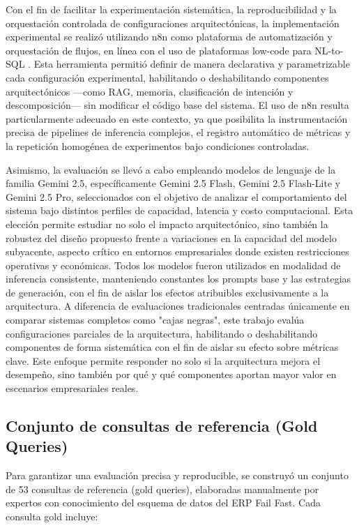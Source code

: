 \documentclass[journal]{IEEEtran}
\begin{document}
Con el fin de facilitar la experimentación sistemática, la reproducibilidad y la orquestación controlada de configuraciones arquitectónicas, la implementación experimental se realizó utilizando n8n como plataforma de automatización y orquestación de flujos, en línea con el uso de plataformas low-code para NL-to-SQL \cite{aparicio2023natural}. Esta herramienta permitió definir de manera declarativa y parametrizable cada configuración experimental, habilitando o deshabilitando componentes arquitectónicos —como RAG, memoria, clasificación de intención y descomposición— sin modificar el código base del sistema. El uso de n8n resulta particularmente adecuado en este contexto, ya que posibilita la instrumentación precisa de pipelines de inferencia complejos, el registro automático de métricas y la repetición homogénea de experimentos bajo condiciones controladas.

Asimismo, la evaluación se llevó a cabo empleando modelos de lenguaje de la familia Gemini 2.5, específicamente Gemini 2.5 Flash, Gemini 2.5 Flash-Lite y Gemini 2.5 Pro, seleccionados con el objetivo de analizar el comportamiento del sistema bajo distintos perfiles de capacidad, latencia y costo computacional. Esta elección permite estudiar no solo el impacto arquitectónico, sino también la robustez del diseño propuesto frente a variaciones en la capacidad del modelo subyacente, aspecto crítico en entornos empresariales donde existen restricciones operativas y económicas. Todos los modelos fueron utilizados en modalidad de inferencia consistente, manteniendo constantes los prompts base y las estrategias de generación, con el fin de aislar los efectos atribuibles exclusivamente a la arquitectura.
A diferencia de evaluaciones tradicionales centradas únicamente en comparar sistemas completos como "cajas negras", este trabajo evalúa configuraciones parciales de la arquitectura, habilitando o deshabilitando componentes de forma sistemática con el fin de aislar su efecto sobre métricas clave. Este enfoque permite responder no solo si la arquitectura mejora el desempeño, sino también por qué y qué componentes aportan mayor valor en escenarios empresariales reales.

\subsection{Conjunto de consultas de referencia (Gold Queries)}

Para garantizar una evaluación precisa y reproducible, se construyó un conjunto de 53 consultas de referencia (gold queries), elaboradas manualmente por expertos con conocimiento del esquema de datos del ERP Fail Fast. Cada consulta gold incluye:
\end{document}

